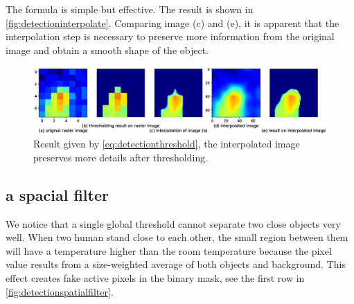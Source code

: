 The formula is simple but effective. The result is shown in \autoref{fig:detectioninterpolate}. Comparing image (c) and (e), it is apparent that the interpolation step is necessary to preserve more information from the original image and obtain a smooth shape of the object.
\begin{figure}
  \centering
  \includegraphics[width=\textwidth]{figures/detect_interpolate.eps}
  \caption{Result given by \autoref{eq:detectionthreshold}, the interpolated image preserves more details after thresholding.}\label{fig:detectioninterpolate}
\end{figure}

\subsection{a spacial filter}
We notice that a single global threshold cannot separate two close objects very well. When two human stand close to each other, the small region between them will have a temperature higher than the room temperature because the pixel value results from a size-weighted average of both objects and background. This effect creates fake active pixels in the binary mask, see the first row in \autoref{fig:detectionspatialfilter}.

